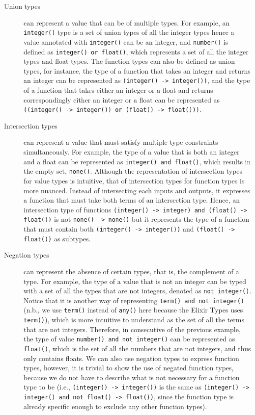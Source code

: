 \begin{description}
\item[Union types] can represent a value that can be of multiple types.
For example, an \texttt{integer()} type is a set of union types of all the integer types hence a value annotated with \texttt{integer()} can be an integer, and \texttt{number()} is defined as \texttt{integer() or float()}, which represents a set of all the integer types and float types.
The function types can also be defined as union types, for instance, the type of a function that takes an integer and returns an integer can be represented as \texttt{(integer() -> integer())}, and the type of a function that takes either an integer or a float and returns correspondingly either an integer or a float can be represented as \texttt{((integer() -> integer()) or (float() -> float()))}.

\item[Intersection types] can represent a value that must satisfy multiple type constraints simultaneously.
For example, the type of a value that is both an integer and a float can be represented as \texttt{integer() and float()}, which results in the empty set, \texttt{none()}.
Although the representation of intersection types for value types is intuitive, that of intersection types for function types is more nuanced.
Instead of intersecting each inputs and outputs, it expresses a function that must take both terms of an intersection type.
Hence, an intersection type of functions \texttt{(integer() -> integer) and (float() -> float())} is not \texttt{none() -> none()} but it represents the type of a function that must contain both \texttt{(integer() -> integer())} and \texttt{(float() -> float())} as subtypes.

\item[Negation types] can represent the absence of certain types, that is, the complement of a type.
For example, the type of a value that is not an integer can be typed with a set of all the types that are not integers, denoted as \texttt{not integer()}.
Notice that it is another way of representing \texttt{term() and not integer()} (n.b., we use \texttt{term()} instead of \texttt{any()} here because the Elixir Types uses \texttt{term()}), which is more intuitive to understand as the set of all the terms that are not integers.
Therefore, in consecutive of the previous example, the type of value \texttt{number() and not integer()} can be represented as \texttt{float()}, which is the set of all the numbers that are not integers, and thus only contains floats.
We can also use negation types to express function types, however, it is trivial to show the use of negated function types, because we do not have to describe what is not necessary for a function type to be (i.e., \texttt{(integer() -> integer())} is the same as \texttt{(integer() -> integer() and not float() -> float())}, since the function type is already specific enough to exclude any other function types).

\end{description}

